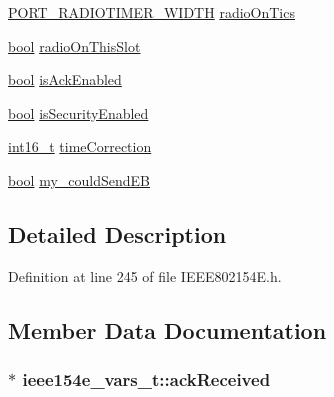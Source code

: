 \begin{DoxyCompactItemize}
\item 
\hyperlink{z1_2board__info_8h_ac16e02aadd749b2d27638bed1a805a59}{P\+O\+R\+T\+\_\+\+R\+A\+D\+I\+O\+T\+I\+M\+E\+R\+\_\+\+W\+I\+D\+TH} \hyperlink{structieee154e__vars__t_a5b065d4ae77d4e4215afa6d6e17686ed}{radio\+On\+Tics}
\item 
\hyperlink{_p_e___types_8h_a97a80ca1602ebf2303258971a2c938e2}{bool} \hyperlink{structieee154e__vars__t_aedad9f8092e08ef46f00dba154418915}{radio\+On\+This\+Slot}
\item 
\hyperlink{_p_e___types_8h_a97a80ca1602ebf2303258971a2c938e2}{bool} \hyperlink{structieee154e__vars__t_a14f7fd97f34f9a71530406a15906c6f1}{is\+Ack\+Enabled}
\item 
\hyperlink{_p_e___types_8h_a97a80ca1602ebf2303258971a2c938e2}{bool} \hyperlink{structieee154e__vars__t_adbe1ceb191c5fc6448668a70da8ec59d}{is\+Security\+Enabled}
\item 
\hyperlink{_p_e___types_8h_a932e6ccc3d54c58f761c1aead83bd6d7}{int16\+\_\+t} \hyperlink{structieee154e__vars__t_a0da028e62f874bda0e754dfb66496e22}{time\+Correction}
\item 
\hyperlink{_p_e___types_8h_a97a80ca1602ebf2303258971a2c938e2}{bool} \hyperlink{structieee154e__vars__t_ace57dfc664b0948d066507ff4f7a77ff}{my\+\_\+could\+Send\+EB}
\end{DoxyCompactItemize}


\subsection{Detailed Description}


Definition at line 245 of file I\+E\+E\+E802154\+E.\+h.



\subsection{Member Data Documentation}
\subsubsection[{\texorpdfstring{ack\+Received}{ackReceived}}]{$\ast$ ieee154e\+\_\+vars\+\_\+t\+::ack\+Received}\hypertarget{structieee154e__vars__t_a63483fa014605bf098b11813b57ff156}{}\label{structieee154e__vars__t_a63483fa014605bf098b11813b57ff156}


